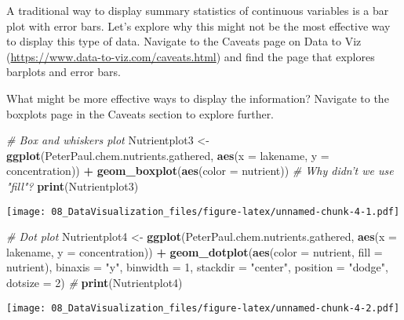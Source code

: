 \documentclass[
]{article}
\newenvironment{Shaded}{\begin{snugshade}}{\end{snugshade}}
\newcommand{\CommentTok}[1]{\textcolor[rgb]{0.56,0.35,0.01}{\textit{#1}}}
\newcommand{\DataTypeTok}[1]{\textcolor[rgb]{0.13,0.29,0.53}{#1}}
\newcommand{\DecValTok}[1]{\textcolor[rgb]{0.00,0.00,0.81}{#1}}
\newcommand{\KeywordTok}[1]{\textcolor[rgb]{0.13,0.29,0.53}{\textbf{#1}}}
\newcommand{\NormalTok}[1]{#1}
\newcommand{\OperatorTok}[1]{\textcolor[rgb]{0.81,0.36,0.00}{\textbf{#1}}}
\newcommand{\StringTok}[1]{\textcolor[rgb]{0.31,0.60,0.02}{#1}}
\begin{document}
A traditional way to display summary statistics of continuous variables
is a bar plot with error bars. Let's explore why this might not be the
most effective way to display this type of data. Navigate to the Caveats
page on Data to Viz (\url{https://www.data-to-viz.com/caveats.html}) and
find the page that explores barplots and error bars.

What might be more effective ways to display the information? Navigate
to the boxplots page in the Caveats section to explore further.

\begin{Shaded}
\begin{Highlighting}[]
\CommentTok{# Box and whiskers plot}
\NormalTok{Nutrientplot3 <-}
\StringTok{  }\KeywordTok{ggplot}\NormalTok{(PeterPaul.chem.nutrients.gathered, }\KeywordTok{aes}\NormalTok{(}\DataTypeTok{x =}\NormalTok{ lakename, }\DataTypeTok{y =}\NormalTok{ concentration)) }\OperatorTok{+}
\StringTok{  }\KeywordTok{geom_boxplot}\NormalTok{(}\KeywordTok{aes}\NormalTok{(}\DataTypeTok{color =}\NormalTok{ nutrient)) }\CommentTok{# Why didn't we use "fill"?}
\KeywordTok{print}\NormalTok{(Nutrientplot3)}
\end{Highlighting}
\end{Shaded}

\texttt{[image: 08\_DataVisualization\_files/figure-latex/unnamed-chunk-4-1.pdf]}

\begin{Shaded}
\begin{Highlighting}[]
\CommentTok{# Dot plot}
\NormalTok{Nutrientplot4 <-}
\StringTok{  }\KeywordTok{ggplot}\NormalTok{(PeterPaul.chem.nutrients.gathered, }\KeywordTok{aes}\NormalTok{(}\DataTypeTok{x =}\NormalTok{ lakename, }\DataTypeTok{y =}\NormalTok{ concentration)) }\OperatorTok{+}
\StringTok{  }\KeywordTok{geom_dotplot}\NormalTok{(}\KeywordTok{aes}\NormalTok{(}\DataTypeTok{color =}\NormalTok{ nutrient, }\DataTypeTok{fill =}\NormalTok{ nutrient), }\DataTypeTok{binaxis =} \StringTok{"y"}\NormalTok{, }\DataTypeTok{binwidth =} \DecValTok{1}\NormalTok{, }
               \DataTypeTok{stackdir =} \StringTok{"center"}\NormalTok{, }\DataTypeTok{position =} \StringTok{"dodge"}\NormalTok{, }\DataTypeTok{dotsize =} \DecValTok{2}\NormalTok{) }\CommentTok{#}
\KeywordTok{print}\NormalTok{(Nutrientplot4)}
\end{Highlighting}
\end{Shaded}

\texttt{[image: 08\_DataVisualization\_files/figure-latex/unnamed-chunk-4-2.pdf]}
\end{document}
